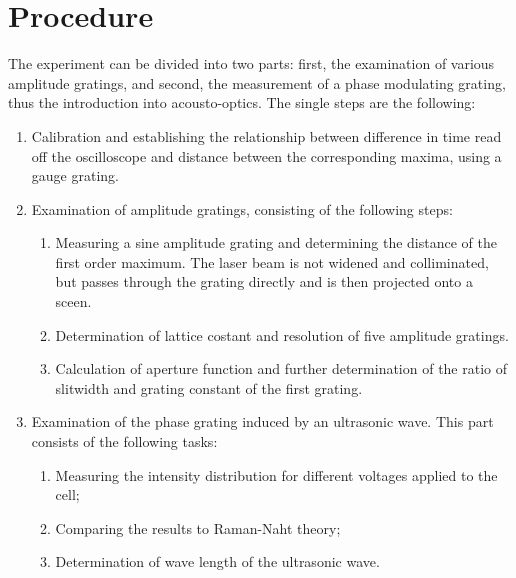 \section{Procedure}
The experiment can be divided into two parts: first, the examination of various 
amplitude gratings, and second, the measurement of a phase modulating grating, 
thus the introduction into acousto-optics. The single steps are the following:
\begin{enumerate}
    \item
        Calibration and establishing the relationship between difference in time 
        read off the oscilloscope and distance between the corresponding maxima, 
        using a gauge grating.
    \item
        Examination of amplitude gratings, consisting of the following steps:
        \begin{enumerate}
            \item
                Measuring a sine amplitude grating and determining the distance of the first 
                order maximum. The laser beam is not widened and colliminated, but 
                passes through the grating directly and is then projected onto a sceen. 
            \item
                Determination of lattice costant and resolution of five amplitude gratings.
            \item
                Calculation of aperture function and further 
                determination of the ratio of slitwidth and grating constant of the first grating. 
        \end{enumerate}
        \item
            Examination of the phase grating induced by an ultrasonic wave. 
            This part consists of the following tasks:
        \begin{enumerate}
            \item
                Measuring the intensity distribution for different voltages applied to the cell;
            \item
                Comparing the results to Raman-Naht theory;
            \item
                Determination of wave length of the ultrasonic wave.
        \end{enumerate}
\end{enumerate}

